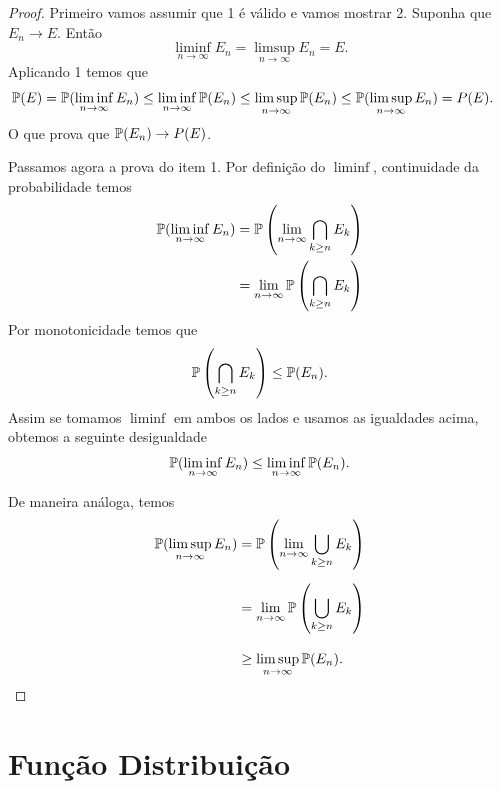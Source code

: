 \begin{proof}
Primeiro vamos assumir que 1 é válido e vamos mostrar 2.
Suponha que $E_n\to E$. Então 
\[
 \liminf_{n\to\infty} E_n = \limsup_{n\to\infty} E_n = E.
\]
Aplicando 1 temos que 
	\begin{align*}
	\P(E)
	&=\displaystyle
		\P(\liminf_{n\to\infty} E_n)
		\leq 
		\liminf_{n\to\infty} \P( E_n)
		\leq
		\limsup_{n\to\infty}\P(E_n)
		\leq
		\P(\limsup_{n\to\infty} E_n)
		=
		P(E).
	\end{align*}
O que prova que $\P(E_n)\to P(E)$.

Passamos agora a prova do item 1. Por definição 
do $\liminf$, continuidade da probabilidade
temos 
\begin{align*}
	\P(\liminf_{n\to\infty} E_n)
	&=
	\P\left( \lim_{n\to\infty} \bigcap_{k\geq n}E_k \right)
	\\
	&=
	\lim_{n\to\infty} \P\left( \bigcap_{k\geq n}E_k \right)
\end{align*}
Por monotonicidade temos que 
	\[
		\P\left( \bigcap_{k\geq n}E_k \right)
		\leq 
		\P(E_n).
	\] 
Assim se tomamos $\liminf$ em ambos os lados e usamos as igualdades acima,
obtemos a seguinte desigualdade
	\begin{align*}
	\P(\liminf_{n\to\infty} E_n)
	\leq 
	\liminf_{n\to\infty}\P(E_n).
\end{align*} 

De maneira análoga, temos 
\begin{align*}
	\P(\limsup_{n\to\infty} E_n)
	&=
	\P\left( \lim_{n\to\infty} \bigcup_{k\geq n}E_k \right)
	\\[0.2cm]
	&=
	\lim_{n\to\infty} \P\left( \bigcup_{k\geq n}E_k \right)
	\\[0.3cm]
	&\geq 
	\limsup_{n\to\infty} \P(E_n).
\end{align*}
\end{proof}



\section{Função Distribuição}


